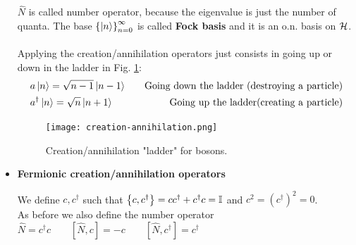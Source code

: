 \begin{itemize}
    $\widehat N$ is called number operator, because the eigenvalue is just the number of quanta. The base $\left\{\left|n\right\rangle\right\}_{n=0}^\infty$ is called \textbf{Fock basis} and it is an o.n. basis on $\mathcal{H}$.\\
    \\
    Applying the creation/annihilation operators just consists in going up or down in the ladder in Fig. \ref{fig:creation-annihilation}:
    \begin{align*}
        &a\left|n\right\rangle = \sqrt{n-1}\left|n-1\right\rangle \quad &\text{Going down the ladder (destroying a particle)}\\
        &a^\dag \left|n\right\rangle = \sqrt n \left|n+1\right\rangle \quad &\text{Going up the ladder(creating a particle)}
    \end{align*}

    \begin{figure}[ht]
        \centering
        \texttt{[image: creation-annihilation.png]}
        \caption{Creation/annihilation "ladder" for bosons.}
        \label{fig:creation-annihilation}
    \end{figure}
    

    \item \textbf{Fermionic creation/annihilation operators}

    We define $c, c^\dag$ such that $\left\{c,c^\dag\right\} = cc^\dag + c^\dag c = \mathbb{I} $ and $ c^2 = \left(c^\dag\right)^2 = 0$. \\
    As before we also define the number operator \\
    $\widehat N = c^\dag c \qquad \left[\widehat N, c \right] = -c \qquad \left[\widehat N, c^\dag\right] = c^\dag$ \\


\end{itemize}
